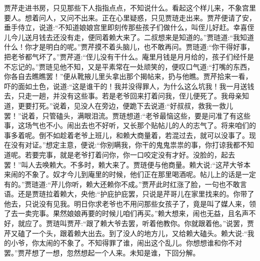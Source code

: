 \begin{parag}
    贾芹走进书房，只见那些下人指指点点，不知说什么。看起这个样儿来，不象宫里要人。想着问人，又问不出来。正在心里疑惑，只见贾琏走出来。贾芹便请了安，垂手侍立，说道:“不知道娘娘宫里即刻传那些孩子们做什么，叫侄儿好赶。幸喜侄儿今儿送月钱去还没有走，便同着赖大来了。二叔想来是知道的。”贾琏道:“我知道什么！你才是明白的呢。”贾芹摸不着头脑儿，也不敢再问。贾琏道:“你干得好事，把老爷都气坏了。”贾芹道:“侄儿没有干什么。庵里月钱是月月给的，孩子们经忏是不忘记的。”贾琏见他不知，又是平素常在一处顽笑的，便叹口气道:“打嘴的东西，你各自去瞧瞧罢！”便从靴掖儿里头拿出那个揭帖来，扔与他瞧。贾芹拾来一看，吓的面如土色，说道:“这是谁干的！我并没得罪人，为什么这么坑我！我一月送钱去，只走一趟，并没有这些事。若是老爷回来打着问我，侄儿便死了。我母亲知道，更要打死。”说着，见没人在旁边，便跪下去说道:“好叔叔，救我一救儿罢！”说着，只管磕头，满眼泪流。贾琏想道:“老爷最恼这些，要是问准了有这些事，这场气也不小。闹出去也不好听，又长那个贴帖儿的人的志气了。将来咱们的事多着呢。倒不如趁着老爷上班儿，和赖大商量着，若混过去，就可以没事了。现在没有对证。”想定主意，便说:“你别瞒我，你干的鬼鬼祟祟的事，你打谅我都不知道呢。若要完事，就是老爷打着问你，你一口咬定没有才好。没脸的，起去罢！”叫人去唤赖大。不多时，赖大来了。贾琏便与他商量。赖大说:“这芹大爷本来闹的不象了。奴才今儿到庵里的时候，他们正在那里喝酒呢。帖儿上的话是一定有的。”贾琏道:“芹儿你听，赖大还赖你不成。”贾芹此时红涨了脸，一句也不敢言语。还是贾琏拉着赖大，央他:“护庇护庇罢，只说是芹哥儿在家里找来的。你带了他去，只说没有见我。明日你求老爷也不用问那些女孩子了，竟是叫了媒人来，领了去一卖完事。果然娘娘再要的时候儿咱们再买。”赖大想来，闹也无益，且名声不好，就应了。贾琏叫贾芹:“跟了赖大爷去罢，听着他教你。你就跟着他。”说罢，贾芹又磕了一个头，跟着赖大出去。到了没人的地方儿，又给赖大磕头。赖大说:“我的小爷，你太闹的不象了。不知得罪了谁，闹出这个乱儿。你想想谁和你不对罢。”贾芹想了一想，忽然想起一个人来。未知是谁，下回分解。
\end{parag}